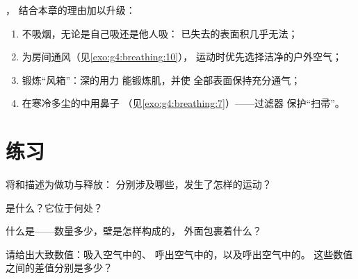 \begin{method}[维护这台机器]\label{met:g7:lungs-and-gas-exchange:keep}
，
结合本章的理由加以升级：
\begin{enumerate}
  \item 不吸烟，无论是自己吸还是他人吸：
        已失去的表面积几乎无法；
  \item 为房间通风（见\cref{exo:g4:breathing:10}），
        运动时优先选择洁净的户外空气；
  \item 锻炼“风箱”：深的用力
        能锻炼肌，并使
        全部表面保持充分通气；
  \item 在寒冷多尘的中用鼻子
        （见\cref{exo:g4:breathing:7}）——过滤器
        保护“扫帚”。
\end{enumerate}
\end{method}

\section{练习}

\begin{exercise}[$\star$]\label{exo:g7:lungs-and-gas-exchange:1}
将和描述为做功与释放：
分别涉及哪些，发生了怎样的运动？
\end{exercise}

\begin{exercise}[$\star$]\label{exo:g7:lungs-and-gas-exchange:2}
是什么？它位于何处？
\end{exercise}

\begin{exercise}[$\star$]\label{exo:g7:lungs-and-gas-exchange:3}
什么是——数量多少，壁是怎样构成的，
外面包裹着什么？
\end{exercise}

\begin{exercise}[$\star$]\label{exo:g7:lungs-and-gas-exchange:4}
请给出大致数值：吸入空气中的、
呼出空气中的，以及呼出空气中的。
这些数值之间的差值分别是多少？
\end{exercise}

